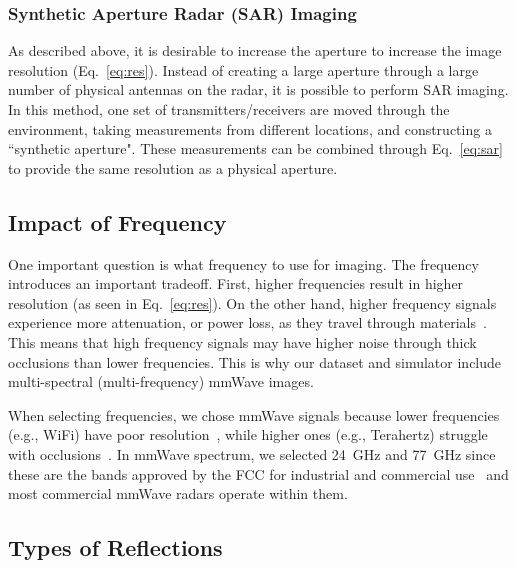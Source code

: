 \vspace{-0.1pt}
\subsubsection{Synthetic Aperture Radar (SAR) Imaging}
\vspace{-0.1pt}
As described above, it is desirable to increase the aperture to increase the image resolution (Eq.~\ref{eq:res}). Instead of creating a large aperture through a large number of physical antennas on the radar, it is possible to perform SAR imaging. In this method, one set of transmitters/receivers are moved through the environment, taking measurements from different locations, and constructing a ``synthetic aperture". These measurements can be combined through Eq.~\ref{eq:sar} to provide the same resolution as a physical aperture. 


\vspace{-0.08pt}
\subsection{Impact of Frequency} \label{sec:bg_freq} 
\vspace{-0.04pt}
One important question is what frequency to use for imaging. The frequency introduces an important tradeoff. First, higher frequencies result in higher resolution (as seen in Eq.~\ref{eq:res}). On the other hand, higher frequency signals experience more attenuation, or power loss, as they travel through materials~\cite{textbook_attenuation}. 
This means that high frequency signals 
may have higher noise through thick occlusions than
lower frequencies. This is why our dataset and simulator include multi-spectral (multi-frequency) mmWave images.

When selecting frequencies, we chose mmWave signals because lower frequencies
(e.g., WiFi) have poor resolution~\cite{adib20143d}, while higher ones (e.g., Terahertz) struggle with occlusions~\cite{thz_penetration}. In mmWave spectrum, we selected 24~GHz and 77~GHz since these are the bands approved by the FCC for industrial and commercial use~\cite{fcc_reg} and most commercial mmWave radars operate within them. 

\vspace{-0.01in}
\subsection{Types of Reflections} \label{sec:bg_refl}
\vspace{-0.03in}


